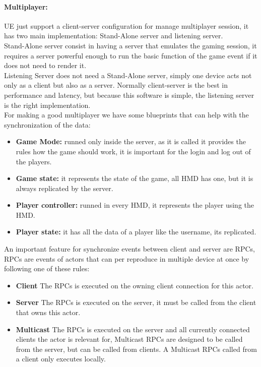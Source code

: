 \paragraph{Multiplayer:}
\ac{UE} just support a client-server configuration for manage multiplayer session, it has two main implementation: Stand-Alone server and listening server.\\
Stand-Alone server consist in having a server that emulates the gaming session, it requires a server powerful enough to run the basic function of the game event if it does not need to render it.\\
Listening Server does not need a Stand-Alone server, simply one device acts not only as a client but also as a server. Normally client-server is the best in performance and latency, but because this software is simple, the listening server is the right implementation.\\
For making a good multiplayer we have some blueprints that can help with the synchronization of the data:
\begin{itemize}
  \item \textbf{Game Mode:} runned only inside the server, as it is called it provides the rules how the game should work, it is important for the login and log out of the players.
  \item \textbf{Game state:} it represents the state of the game, all \ac{HMD} has one, but it is always replicated by the server.
  \item \textbf{Player controller:} runned in every \ac{HMD}, it represents the player using the \ac{HMD}.
  \item \textbf{Player state:} it has all the data of a player like the username, its replicated.
\end{itemize}
\noindent
An important feature for synchronize events between client and server are \ac{RPCs}, \ac{RPCs} are events of actors that can per reproduce in multiple device at once by following one of these rules:
\begin{itemize}
  \item \textbf{Client} The \ac{RPCs} is executed on the owning client connection for this actor.
  \item \textbf{Server} The \ac{RPCs} is executed on the server, it must be called from the client that owns this actor.
  \item \textbf{Multicast} The \ac{RPCs} is executed on the server and all currently connected clients the actor is relevant for, Multicast \ac{RPCs} are designed to be called from the server, but can be called from clients. A Multicast \ac{RPCs} called from a client only executes locally.
\end{itemize}

